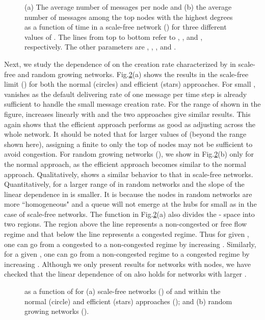 \documentclass[aps,prl,twocolumn,superscriptaddress,showpacs]{revtex4}
\begin{document}
\begin{figure}
\begin{center}
 \caption{(a) The
average number of messages per node and (b) the average number of
messages among the top  nodes with the highest degrees as a
function of time in a scale-free network () for three
different values of .  The lines from top to bottom refer
to , , and , respectively. The other
parameters are , , , and .}
\label{fig3}
\end{center}
\end{figure}

Next, we study the dependence of  on the creation rate
characterized by  in scale-free and random growing
networks.  Fig.\ref{fig4}(a) shows the results in the scale-free
limit () for both the normal (circles) and efficient (stars)
approaches. For small ,  vanishes as the
default delivering rate of one message per time step is already
sufficient to handle the small message creation rate.  For the
range of  shown in the figure,  increases
linearly with  and the two approaches give similar
results.  This again shows that the efficient approach performs as
good as adjusting  across the whole network. It should be
noted that for larger values of  (beyond the range shown
here), assigning a finite  to only the top  of nodes
may not be sufficient to avoid congestion.   For random growing
networks (), we show  in
Fig.\ref{fig4}(b) only for the normal approach, as the efficient
approach becomes similar to the normal approach.  Qualitatively,
 shows a similar behavior to that in
scale-free networks.  Quantitatively,  for a larger
range of  in random networks and the slope of the linear
dependence in  is smaller.  It is because the
nodes in random networks are more ``homogeneous" and a queue will
not emerge at the hubs for small  as in the case of
scale-free networks.  The function  in
Fig.\ref{fig4}(a) also divides the - space into
two regions.  The region above the line represents a non-congested
or free flow regime and that below the line represents a congested
regime. Thus for given , one can go from a congested to a
non-congested regime by increasing .  Similarly, for a
given , one can go from a non-congested regime to a
congested regime by increasing .  Although we only
present results for networks with  nodes, we have checked
that the linear dependence of  on  also holds
for networks with larger .

\begin{figure}
\begin{center}
 \caption{
as a function of  for (a) scale-free networks () of
 and  within the normal (circle) and efficient
(stars) approaches (); and (b) random growing networks
().} \label{fig4}
\end{center}
\end{figure}
\end{document}
